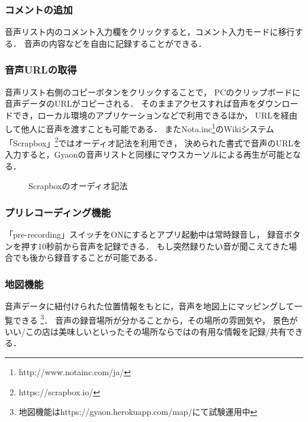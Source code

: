\subsubsection{コメントの追加}
音声リスト内のコメント入力欄をクリックすると，コメント入力モードに移行する．
音声の内容などを自由に記録することができる．

\subsubsection{音声URLの取得}
音声リスト右側のコピーボタンをクリックすることで，
PCのクリップボードに音声データのURLがコピーされる．
そのままアクセスすれば音声をダウンロードでき，ローカル環境のアプリケーションなどで利用できるほか，
URLを経由して他人に音声を渡すことも可能である．
またNota.inc\footnote{\textsf{http://www.notainc.com/ja/}}のWikiシステム
「Scrapbox」\footnote{\textsf{https://scrapbox.io/}}ではオーディオ記法を利用でき，
決められた書式で音声のURLを入力すると，Gyaonの音声リストと同様にマウスカーソルによる再生が可能となる．

\begin{figure}[H]
\centering
{}
\caption{Scrapboxのオーディオ記法}
\label{scrapbox}
\end{figure}

\subsubsection{プリレコーディング機能}
「pre-recording」スイッチをONにするとアプリ起動中は常時録音し，
録音ボタンを押す10秒前から音声を記録できる．
もし突然録りたい音が聞こえてきた場合でも後から録音することが可能である．

\subsubsection{地図機能}
音声データに紐付けられた位置情報をもとに，音声を地図上にマッピングして一覧できる
\footnote{\textsf{地図機能はhttps://gyaon.herokuapp.com/map/にて試験運用中}}．
音声の録音場所が分かることから，その場所の雰囲気や，
景色がいい/この店は美味しいといったその場所ならではの有用な情報を記録/共有できる．

